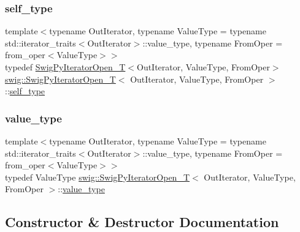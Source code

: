 \subsubsection{\texorpdfstring{self\+\_\+type}{self\_type}}
{\footnotesize\ttfamily template$<$typename Out\+Iterator, typename Value\+Type = typename std\+::iterator\+\_\+traits$<$\+Out\+Iterator$>$\+::value\+\_\+type, typename From\+Oper = from\+\_\+oper$<$\+Value\+Type$>$$>$ \\
typedef \hyperlink{classswig_1_1_swig_py_iterator_open___t}{Swig\+Py\+Iterator\+Open\+\_\+T}$<$Out\+Iterator, Value\+Type, From\+Oper$>$ \hyperlink{classswig_1_1_swig_py_iterator_open___t}{swig\+::\+Swig\+Py\+Iterator\+Open\+\_\+T}$<$ Out\+Iterator, Value\+Type, From\+Oper $>$\+::\hyperlink{classswig_1_1_swig_py_iterator___t_af10eb8078eb41f1dbca3701f27bd8e73}{self\+\_\+type}}

\mbox{\label{classswig_1_1_swig_py_iterator_open___t_ac5d08f0ecc1d014a83632411678103f3}} 
\subsubsection{\texorpdfstring{value\+\_\+type}{value\_type}}
{\footnotesize\ttfamily template$<$typename Out\+Iterator, typename Value\+Type = typename std\+::iterator\+\_\+traits$<$\+Out\+Iterator$>$\+::value\+\_\+type, typename From\+Oper = from\+\_\+oper$<$\+Value\+Type$>$$>$ \\
typedef Value\+Type \hyperlink{classswig_1_1_swig_py_iterator_open___t}{swig\+::\+Swig\+Py\+Iterator\+Open\+\_\+T}$<$ Out\+Iterator, Value\+Type, From\+Oper $>$\+::\hyperlink{classswig_1_1_swig_py_iterator___t_a1441e2409c41706ad7aee977165f675e}{value\+\_\+type}}



\subsection{Constructor \& Destructor Documentation}
\mbox{\label{classswig_1_1_swig_py_iterator_open___t_aad68570a11be76ad2e4c5abbdca54b1e}} 
